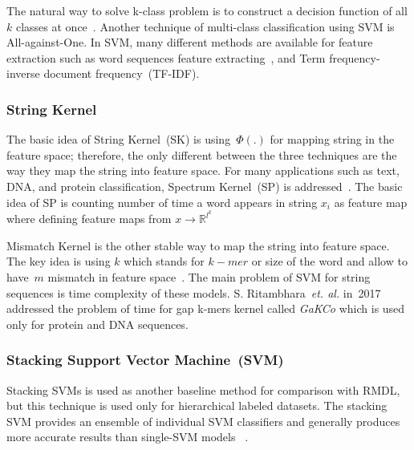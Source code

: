 \documentclass[sigconf, final]{acmart}
\begin{document}
The natural way to solve k-class problem is to construct a decision function of all $k$ classes at once~\cite{chen2016turning,weston1998multi}.  
Another technique of multi-class classification using SVM is All-against-One. In SVM, many different methods are available for feature extraction such as word sequences feature extracting~\cite{zhang2008text}, and Term frequency-inverse document frequency~(TF-IDF).
\subsubsection*{String Kernel}\label{String_kernel}
The basic idea of String Kernel~(SK) is using~$\Phi(.)$ for mapping string in the feature space; therefore, the only different between the three techniques are the way they map the string into feature space. For many applications such as text, DNA, and protein classification, Spectrum Kernel~(SP) is addressed~\cite{leslie2002spectrum,eskin2002mismatch}. The basic idea of SP is counting number of time a word appears in string $x_i$  as feature map where defining feature maps from $x \rightarrow \mathbb{R}^{l^k}$

 Mismatch Kernel is the other stable way to map the string into feature space. The key idea is using $k$ which stands for $k-mer$ or size of the word and allow to have~$m$ mismatch in feature space~\cite{leslie2004mismatch}. The main problem of SVM for string sequences is time complexity of these models. S. Ritambhara~\textit{et. al.} in~2017~\cite{singh2017gakco} addressed the problem of time for gap k-mers kernel called \textit{GaKCo} which is used only for protein and DNA sequences.
 

\subsubsection{Stacking Support Vector Machine~(SVM)}
Stacking SVMs is used as another baseline method for comparison with RMDL, but this technique is used only for hierarchical labeled datasets. The stacking SVM provides an ensemble of individual SVM classifiers and generally produces more accurate results than single-SVM models  ~\cite{sun2001hierarchical,sebastiani2002machine}.
\end{document}
